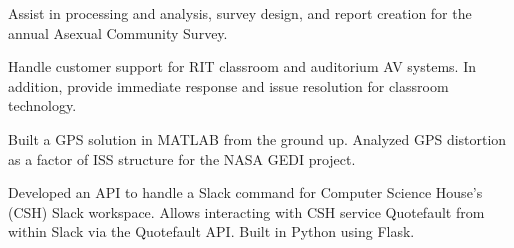 \documentclass[10pt,a4paper]{altacv}
\begin{document}

\begin{fullwidth}
\marginpar{\makesidebarheader}
    \vspace*{-1\baselineskip}
\makecvheader
\end{fullwidth}

Assist in processing and analysis, survey design, and report creation for the annual Asexual Community Survey.

\divider

Handle customer support for RIT classroom and auditorium AV systems.
In addition, provide immediate response and issue resolution for classroom technology.

\divider

Built a GPS solution in MATLAB from the ground up. Analyzed GPS distortion as a factor of ISS structure for the NASA GEDI project.


Developed an API to handle a Slack command for Computer Science House's (CSH) Slack workspace.
Allows interacting with CSH service Quotefault from within Slack via the Quotefault API.
Built in Python using Flask.

\divider
\end{document}
